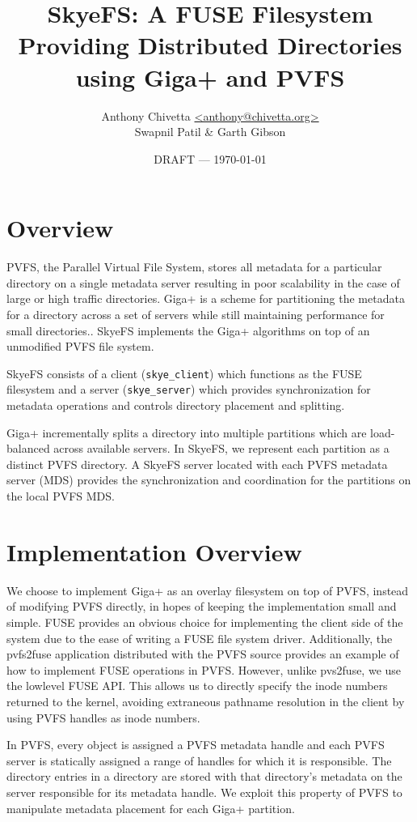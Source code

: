 \documentclass[twocolumn,letterpaper]{article}
\title{SkyeFS: A FUSE Filesystem Providing Distributed Directories using Giga+
and PVFS}
\author{Anthony Chivetta \url{<anthony@chivetta.org>}\\Swapnil Patil \& Garth
Gibson}
\date{DRAFT --- \today}
\newcommand{\code}[1]{\texttt{#1}}
\begin{document}
\maketitle

\section{Overview}
PVFS, the Parallel Virtual File System, stores all metadata for a particular
directory on a single metadata server resulting in poor scalability in the case
of large or high traffic directories.  Giga+ is a scheme for partitioning the
metadata for a directory across a set of servers while still maintaining
performance for small directories..  SkyeFS implements the Giga+ algorithms on
top of an unmodified PVFS file system.

SkyeFS consists of a client (\code{skye\_\-client}) which functions as the
FUSE filesystem and a server (\code{skye\_\-server}) which provides
synchronization for metadata operations and controls directory placement and
splitting.  

Giga+ incrementally splits a directory into multiple partitions which are
load-balanced across available servers.  In SkyeFS, we represent each
partition as a distinct PVFS directory.  A SkyeFS server located with each
PVFS metadata server (MDS) provides the synchronization and coordination for
the partitions on the local PVFS MDS. 

\section{Implementation Overview}
We choose to implement Giga+ as an overlay filesystem on top of PVFS, instead
of modifying PVFS directly, in hopes of keeping the implementation small and
simple.  FUSE provides an obvious choice for implementing the client side of
the system due to the ease of writing a FUSE file system driver.
Additionally, the pvfs2\-fuse application distributed with the PVFS source
provides an example of how to implement FUSE operations in PVFS.  However,
unlike pvs2\-fuse, we use the lowlevel FUSE API.  This allows us to directly
specify the inode numbers returned to the kernel, avoiding extraneous pathname
resolution in the client by using PVFS handles as inode numbers.

In PVFS, every object is assigned a PVFS metadata handle and each PVFS server
is statically assigned a range of handles for which it is responsible.  
The directory entries in a directory are stored with that directory's metadata
on the server responsible for its metadata handle.  We exploit this property
of PVFS to manipulate metadata placement for each Giga+ partition.
\end{document}
